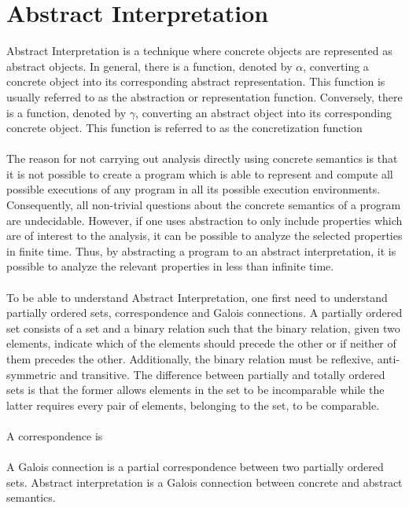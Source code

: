 \documentclass{kththesis}
\begin{document}
\section{Abstract Interpretation}\label{sec:AbsInt}
Abstract Interpretation is a technique where concrete objects are represented as abstract objects. In general, there is a function, denoted by $\alpha$, converting a concrete object into its corresponding abstract representation. This function is usually referred to as the abstraction or representation function. Conversely, there is a function, denoted by $\gamma$, converting an abstract object into its corresponding concrete object. This function is referred to as the concretization function
\\ \\%
The reason for not carrying out analysis directly using concrete semantics is that it is not possible to create a program which is able to represent and compute all possible executions of any program in all its possible execution environments\parencite{FRPatrick}. Consequently, all non-trivial questions about the concrete semantics of a program are undecidable. However, if one uses abstraction to only include properties which are of interest to the analysis, it can be possible to analyze the selected properties in finite time. Thus, by abstracting a program to an abstract interpretation, it is possible to analyze the relevant properties in less than infinite time.
\\ \\
To be able to understand Abstract Interpretation, one first need to understand partially ordered sets\parencite{EoMPoset}, correspondence\parencite{EoMCorrespondence} and Galois connections. A partially ordered set consists of a set and a binary relation such that the binary relation, given two elements, indicate which of the elements should precede the other or if neither of them precedes the other. Additionally, the binary relation must be reflexive, anti-symmetric and transitive. The difference between partially and totally ordered sets is that the former allows elements in the set to be incomparable while the latter requires every pair of elements, belonging to the set, to be comparable.
\\ \\
A correspondence is
\\ \\
A Galois connection is a partial correspondence between two partially ordered sets. Abstract interpretation is a Galois connection between concrete and abstract semantics.
\end{document}

